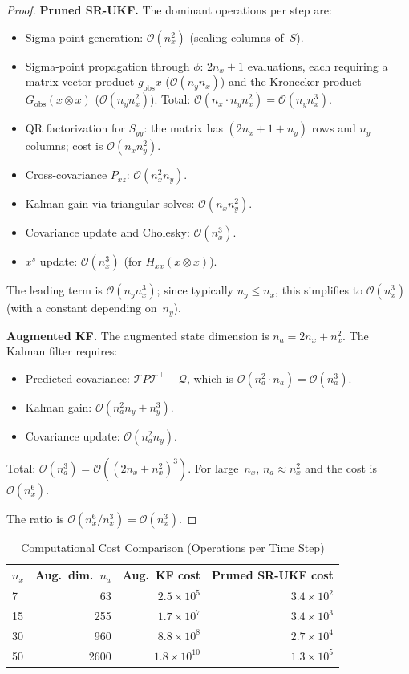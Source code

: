\documentclass[12pt,a4paper]{article}
\newcommand{\kron}{\otimes}
\newcommand{\xs}{{x^{s}}}
\newcommand{\Hxx}{H_{xx}}
\newcommand{\cO}{\mathcal{O}}
\begin{document}
\begin{proof}
\textbf{Pruned SR-UKF.}
The dominant operations per step are:
\begin{itemize}[nosep]
\item Sigma-point generation: $\cO(n_x^2)$ (scaling columns of~$S$).
\item Sigma-point propagation through $\phi$: $2n_x + 1$ evaluations,
each requiring a matrix-vector product $g_{\mathrm{obs}} x$
($\cO(n_y n_x)$) and the Kronecker product $G_{\mathrm{obs}}(x \kron x)$
($\cO(n_y n_x^2)$). Total: $\cO(n_x \cdot n_y n_x^2) = \cO(n_y n_x^3)$.
\item QR factorization for $S_{yy}$: the matrix has
$(2n_x + 1 + n_y)$ rows and $n_y$ columns;
cost is $\cO(n_x n_y^2)$.
\item Cross-covariance $P_{xz}$: $\cO(n_x^2 n_y)$.
\item Kalman gain via triangular solves: $\cO(n_x n_y^2)$.
\item Covariance update and Cholesky: $\cO(n_x^3)$.
\item $\xs$ update: $\cO(n_x^3)$ (for $\Hxx(x \kron x)$).
\end{itemize}
The leading term is $\cO(n_y n_x^3)$; since typically $n_y \leq n_x$,
this simplifies to $\cO(n_x^3)$ (with a constant depending on~$n_y$).

\textbf{Augmented KF.}
The augmented state dimension is $n_a = 2n_x + n_x^2$. The Kalman
filter requires:
\begin{itemize}[nosep]
\item Predicted covariance: $\mathcal{T} P \mathcal{T}^\top + \mathcal{Q}$,
which is $\cO(n_a^2 \cdot n_a) = \cO(n_a^3)$.
\item Kalman gain: $\cO(n_a^2 n_y + n_y^3)$.
\item Covariance update: $\cO(n_a^2 n_y)$.
\end{itemize}
Total: $\cO(n_a^3) = \cO((2n_x + n_x^2)^3)$. For large~$n_x$,
$n_a \approx n_x^2$ and the cost is $\cO(n_x^6)$.

The ratio is $\cO(n_x^6 / n_x^3) = \cO(n_x^3)$.
\end{proof}

\begin{table}[htbp]
\centering
\caption{Computational Cost Comparison (Operations per Time Step)}
\label{tab:cost}
\begin{tabular}{@{}lrrr@{}}
\toprule
$n_x$ & Aug.\ dim.\ $n_a$ & Aug.\ KF cost
  & Pruned SR-UKF cost \\
\midrule
 7 &  63 & $2.5 \times 10^5$ & $3.4 \times 10^2$ \\
15 & 255 & $1.7 \times 10^7$ & $3.4 \times 10^3$ \\
30 & 960 & $8.8 \times 10^8$ & $2.7 \times 10^4$ \\
50 & 2600 & $1.8 \times 10^{10}$ & $1.3 \times 10^5$ \\
\bottomrule
\end{tabular}
\end{table}
\end{document}

